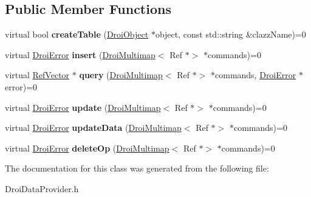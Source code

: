 \subsection*{Public Member Functions}
\begin{DoxyCompactItemize}
\item 
\mbox{\label{class_droi_data_provider_a77af22160eae523747d99c8823d3d3ce}} 
virtual bool {\bfseries create\+Table} (\hyperlink{class_droi_object}{Droi\+Object} $\ast$object, const std\+::string \&clazz\+Name)=0
\item 
\mbox{\label{class_droi_data_provider_a52965ff320b3eb082be8afcc9b081aaf}} 
virtual \hyperlink{class_droi_error}{Droi\+Error} {\bfseries insert} (\hyperlink{class_droi_multimap}{Droi\+Multimap}$<$ Ref $\ast$$>$ $\ast$commands)=0
\item 
\mbox{\label{class_droi_data_provider_a02f4d101ca6655c6c3a2010427315dc9}} 
virtual \hyperlink{class_ref_vector}{Ref\+Vector} $\ast$ {\bfseries query} (\hyperlink{class_droi_multimap}{Droi\+Multimap}$<$ Ref $\ast$$>$ $\ast$commands, \hyperlink{class_droi_error}{Droi\+Error} $\ast$error)=0
\item 
\mbox{\label{class_droi_data_provider_a8e92c33240daa1432659c2f87b260c63}} 
virtual \hyperlink{class_droi_error}{Droi\+Error} {\bfseries update} (\hyperlink{class_droi_multimap}{Droi\+Multimap}$<$ Ref $\ast$$>$ $\ast$commands)=0
\item 
\mbox{\label{class_droi_data_provider_acd80ea742444a5179748a47a757ad5f9}} 
virtual \hyperlink{class_droi_error}{Droi\+Error} {\bfseries update\+Data} (\hyperlink{class_droi_multimap}{Droi\+Multimap}$<$ Ref $\ast$$>$ $\ast$commands)=0
\item 
\mbox{\label{class_droi_data_provider_a1e90847f9819b55830f158a8a682eb86}} 
virtual \hyperlink{class_droi_error}{Droi\+Error} {\bfseries delete\+Op} (\hyperlink{class_droi_multimap}{Droi\+Multimap}$<$ Ref $\ast$$>$ $\ast$commands)=0
\end{DoxyCompactItemize}


The documentation for this class was generated from the following file\+:\begin{DoxyCompactItemize}
\item 
Droi\+Data\+Provider.\+h\end{DoxyCompactItemize}
